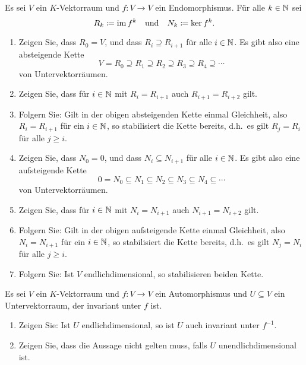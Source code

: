 \documentclass[a4paper,10pt]{scrartcl}
\begin{document}
\begin{question}
  Es sei $V$ ein $K$-Vektorraum und $f \colon V \to V$ ein Endomorphismus.
  Für alle $k \in \mathbb{N}$ sei
  \[
    R_k \coloneqq \operatorname{im} f^k
    \quad\text{und}\quad
    N_k \coloneqq \ker f^k.
  \]
  \begin{enumerate}[leftmargin=*]
    \item
      Zeigen Sie, dass $R_0 = V$, und dass $R_i \supseteq R_{i+1}$ für alle $i \in \mathbb{N}$.
      Es gibt also eine absteigende Kette
      \[
        V = R_0 \supseteq R_1 \supseteq R_2 \supseteq R_3 \supseteq R_4 \supseteq \dotsb
      \]
      von Untervektorräumen.
    \item
      Zeigen Sie, dass für $i \in \mathbb{N}$ mit $R_i = R_{i+1}$ auch $R_{i+1} = R_{i+2}$ gilt.
    \item
      Folgern Sie:
      Gilt in der obigen absteigenden Kette einmal Gleichheit, also $R_i = R_{i+1}$ für ein $i \in \mathbb{N}$, so stabilisiert die Kette bereits, d.h.\ es gilt $R_j = R_i$ für alle $j \geq i$.
    \item
      Zeigen Sie, dass $N_0 = 0$, und dass $N_i \subseteq N_{i+1}$ für alle $i \in \mathbb{N}$.
      Es gibt also eine aufsteigende Kette
      \[
        0 = N_0 \subseteq N_1 \subseteq N_2 \subseteq N_3 \subseteq N_4 \subseteq \dotsb
      \]
      von Untervektorräumen.
    \item
      Zeigen Sie, dass für $i \in \mathbb{N}$ mit $N_i = N_{i+1}$ auch $N_{i+1} = N_{i+2}$ gilt.
    \item
      Folgern Sie:
      Gilt in der obigen aufsteigende Kette einmal Gleichheit, also $N_i = N_{i+1}$ für ein $i \in \mathbb{N}$, so stabilisiert die Kette bereits, d.h.\ es gilt $N_j = N_i$ für alle $j \geq i$.
    \item
      Folgern Sie:
      Ist $V$ endlichdimensional, so stabilisieren beiden Kette.
  \end{enumerate}
\end{question}


\begin{question}
  Es sei $V$ ein $K$-Vektorraum und $f \colon V \to V$ ein Automorphismus und $U \subseteq V$ ein Untervektorraum, der invariant unter $f$ ist.
  \begin{enumerate}[leftmargin=*]
    \item
      Zeigen Sie:
      Ist $U$ endlichdimensional, so ist $U$ auch invariant unter $f^{-1}$.
    \item
      Zeigen Sie, dass die Aussage nicht gelten muss, falls $U$ unendlichdimensional ist.
  \end{enumerate}
\end{question}
\end{document}
